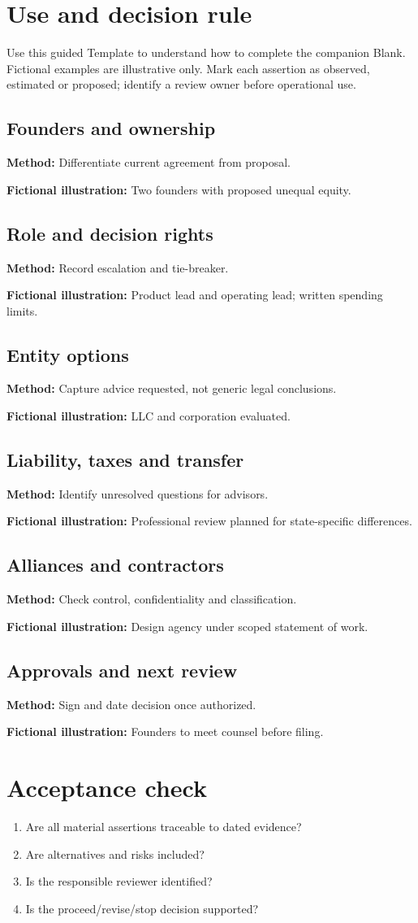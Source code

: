 \documentclass[11pt]{article}
\begin{document}
\SuiteOpen
\section{Use and decision rule}
Use this guided Template to understand how to complete the companion Blank. Fictional examples are illustrative only. Mark each assertion as observed, estimated or proposed; identify a review owner before operational use.
\subsection*{Founders and ownership}
\textbf{Method:} Differentiate current agreement from proposal.\par\textbf{Fictional illustration:} Two founders with proposed unequal equity.\par
\subsection*{Role and decision rights}
\textbf{Method:} Record escalation and tie-breaker.\par\textbf{Fictional illustration:} Product lead and operating lead; written spending limits.\par
\subsection*{Entity options}
\textbf{Method:} Capture advice requested, not generic legal conclusions.\par\textbf{Fictional illustration:} LLC and corporation evaluated.\par
\subsection*{Liability, taxes and transfer}
\textbf{Method:} Identify unresolved questions for advisors.\par\textbf{Fictional illustration:} Professional review planned for state-specific differences.\par
\subsection*{Alliances and contractors}
\textbf{Method:} Check control, confidentiality and classification.\par\textbf{Fictional illustration:} Design agency under scoped statement of work.\par
\subsection*{Approvals and next review}
\textbf{Method:} Sign and date decision once authorized.\par\textbf{Fictional illustration:} Founders to meet counsel before filing.\par
\section{Acceptance check}
\begin{enumerate}[leftmargin=*,itemsep=5pt]
\item Are all material assertions traceable to dated evidence?
\item Are alternatives and risks included?
\item Is the responsible reviewer identified?
\item Is the proceed/revise/stop decision supported?
\end{enumerate}
\end{document}
